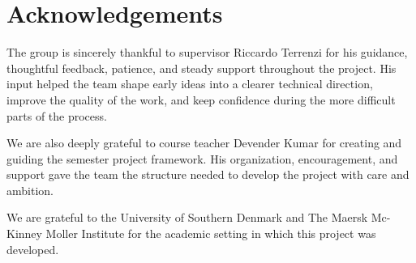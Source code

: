\section{Acknowledgements}
\label{sec:acknowledgements}

The group is sincerely thankful to supervisor Riccardo Terrenzi for his guidance, thoughtful feedback, patience, and steady support throughout the project. His input helped the team shape early ideas into a clearer technical direction, improve the quality of the work, and keep confidence during the more difficult parts of the process.

We are also deeply grateful to course teacher Devender Kumar for creating and guiding the semester project framework. His organization, encouragement, and support gave the team the structure needed to develop the project with care and ambition.

We are grateful to the University of Southern Denmark and The Maersk Mc-Kinney Moller Institute for the academic setting in which this project was developed.